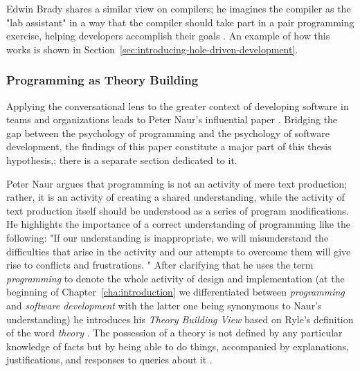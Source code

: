 Edwin Brady shares a similar view on compilers; he imagines the compiler as the "lab assistant" in a way that the compiler should take part in a pair programming exercise, helping developers accomplish their goals \cite{brady_type-driven_2017}.
An example of how this works is shown in Section~\ref{sec:introducing-hole-driven-development}.


\subsubsection{Programming as Theory Building}
\label{sec:programming-as-theory-building}
Applying the conversational lens to the greater context of developing software in teams and organizations leads to Peter Naur's influential paper  \cite{naur_programming_1985}.
Bridging the gap between the psychology of programming and the psychology of software development, the findings of this paper constitute a major part of this thesis hypothesis,; there is a separate section dedicated to it.

Peter Naur argues that programming is not an activity of mere text production; rather, it is an activity of creating a shared understanding, while the activity of text production itself should be understood as a series of program modifications.
He highlights the importance of a correct understanding of programming like the following: "If our understanding is inappropriate, we will misunderstand the difficulties that arise in the activity and our attempts to overcome them will give rise to conflicts and frustrations. \cite{naur_programming_1985}"
After clarifying that he uses the term \emph{programming} to denote the whole activity of design and implementation (at the beginning of Chapter~\ref{cha:introduction} we differentiated between \emph{programming} and \emph{software development} with the latter one being synonymous to Naur's understanding) he introduces his \emph{Theory Building View} based on Ryle's definition of the word \emph{theory} \cite{ryle_concept_1984}.
The possession of a theory is not defined by any particular knowledge of facts but by being able to do things, accompanied by explanations, justifications, and responses to queries about it \cite{mouratidis_revisiting_2011}.

